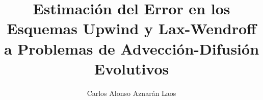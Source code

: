 \renewcommand{\cfttabpresnum}{Tabla N°}
\renewcommand{\cfttabnumwidth}{6.5 em}


\usepackage{xcolor}

\renewcommand{\thechapter}{\Roman{chapter}}
\renewcommand{\theequation}{\arabic{chapter}.\arabic{equation}}
\renewcommand{\thesection}{\arabic{chapter}.\arabic{section}}
\renewcommand{\thetable}{\arabic{chapter}.\arabic{table}}
\renewcommand{\thefigure}{\arabic{chapter}.\arabic{figure}}

\providecommand{\averageconcentration}{\overline{u}\left(x,t\right)}
\providecommand{\inner}[2]{\left\langle #1, #2 \right\rangle}


\theoremstyle{definition}
\newtheorem{theorem}{Teorema}
\newtheorem{definition}{Definición}
\newtheorem{example}{Ejemplo}
\newtheorem{proposition}{Proposición}


\author{Carlos Alonso Aznarán Laos}


\title{Estimación del Error en los Esquemas Upwind y Lax-Wendroff a Problemas de Advección-Difusión Evolutivos}




